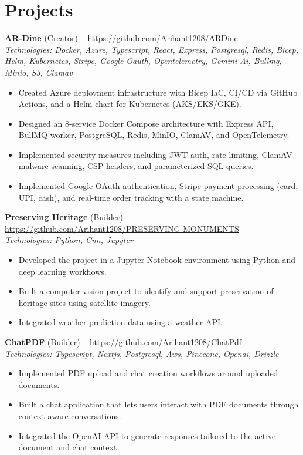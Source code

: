 \documentclass[11pt,a4paper]{article}
\begin{document}
\section{Projects}
\textbf{AR-Dine} (Creator) -- \href{https://github.com/Arihant1208/ARDine}{https://github.com/Arihant1208/ARDine}
\\ \textit{Technologies: Docker, Azure, Typescript, React, Express, Postgresql, Redis, Bicep, Helm, Kubernetes, Stripe, Google Oauth, Opentelemetry, Gemini Ai, Bullmq, Minio, S3, Clamav}
\begin{itemize}
  \item Created Azure deployment infrastructure with Bicep IaC, CI/CD via GitHub Actions, and a Helm chart for Kubernetes (AKS/EKS/GKE).
  \item Designed an 8-service Docker Compose architecture with Express API, BullMQ worker, PostgreSQL, Redis, MinIO, ClamAV, and OpenTelemetry.
  \item Implemented security measures including JWT auth, rate limiting, ClamAV malware scanning, CSP headers, and parameterized SQL queries.
  \item Implemented Google OAuth authentication, Stripe payment processing (card, UPI, cash), and real-time order tracking with a state machine.
\end{itemize}
\vspace{2pt}
\textbf{Preserving Heritage} (Builder) -- \href{https://github.com/Arihant1208/PRESERVING-MONUMENTS}{https://github.com/Arihant1208/PRESERVING-MONUMENTS}
\\ \textit{Technologies: Python, Cnn, Jupyter}
\begin{itemize}
  \item Developed the project in a Jupyter Notebook environment using Python and deep learning workflows.
  \item Built a computer vision project to identify and support preservation of heritage sites using satellite imagery.
  \item Integrated weather prediction data using a weather API.
\end{itemize}
\vspace{2pt}
\textbf{ChatPDF} (Builder) -- \href{https://github.com/Arihant1208/ChatPdf}{https://github.com/Arihant1208/ChatPdf}
\\ \textit{Technologies: Typescript, Nextjs, Postgresql, Aws, Pinecone, Openai, Drizzle}
\begin{itemize}
  \item Implemented PDF upload and chat creation workflows around uploaded documents.
  \item Built a chat application that lets users interact with PDF documents through context-aware conversations.
  \item Integrated the OpenAI API to generate responses tailored to the active document and chat context.
\end{itemize}
\vspace{2pt}
\end{document}
